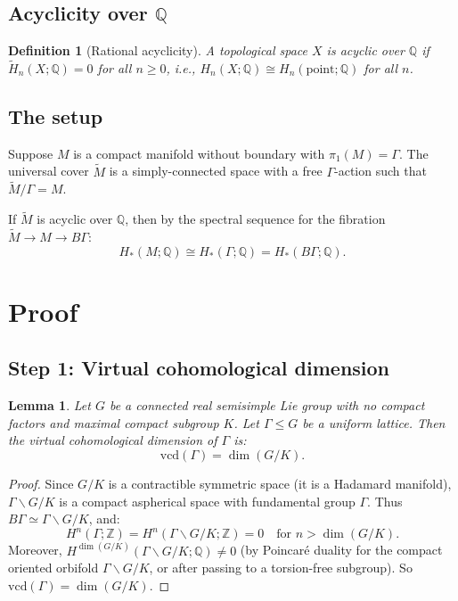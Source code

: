 \documentclass[12pt]{article}
\newtheorem{lemma}[theorem]{Lemma}
\newtheorem{definition}[theorem]{Definition}
\begin{document}
\subsection{Acyclicity over $\mathbb{Q}$}

\begin{definition}[Rational acyclicity]
A topological space $X$ is \emph{acyclic over $\mathbb{Q}$} if $\tilde{H}_n(X; \mathbb{Q}) = 0$ for all $n \geq 0$, i.e., $H_n(X; \mathbb{Q}) \cong H_n(\text{point}; \mathbb{Q})$ for all $n$.
\end{definition}

\subsection{The setup}

Suppose $M$ is a compact manifold without boundary with $\pi_1(M) = \Gamma$. The universal cover $\widetilde{M}$ is a simply-connected space with a free $\Gamma$-action such that $\widetilde{M}/\Gamma = M$.

If $\widetilde{M}$ is acyclic over $\mathbb{Q}$, then by the spectral sequence for the fibration $\widetilde{M} \to M \to B\Gamma$:
\[
H_*(M; \mathbb{Q}) \cong H_*(\Gamma; \mathbb{Q}) = H_*(B\Gamma; \mathbb{Q}).
\]

\section{Proof}

\subsection{Step 1: Virtual cohomological dimension}

\begin{lemma}\label{lem:vcd}
Let $G$ be a connected real semisimple Lie group with no compact factors and maximal compact subgroup $K$. Let $\Gamma \leq G$ be a uniform lattice. Then the virtual cohomological dimension of $\Gamma$ is:
\[
\mathrm{vcd}(\Gamma) = \dim(G/K).
\]
\end{lemma}

\begin{proof}
Since $G/K$ is a contractible symmetric space (it is a Hadamard manifold), $\Gamma \backslash G/K$ is a compact aspherical space with fundamental group $\Gamma$. Thus $B\Gamma \simeq \Gamma \backslash G/K$, and:
\[
H^n(\Gamma; \mathbb{Z}) = H^n(\Gamma \backslash G/K; \mathbb{Z}) = 0 \quad \text{for } n > \dim(G/K).
\]
Moreover, $H^{\dim(G/K)}(\Gamma \backslash G/K; \mathbb{Q}) \neq 0$ (by Poincar\'{e} duality for the compact oriented orbifold $\Gamma \backslash G/K$, or after passing to a torsion-free subgroup). So $\mathrm{vcd}(\Gamma) = \dim(G/K)$.
\end{proof}
\end{document}
